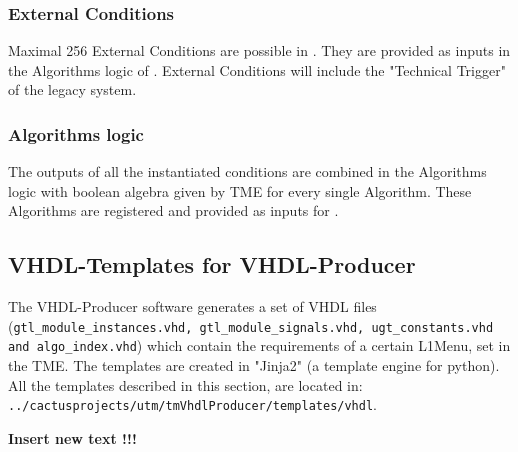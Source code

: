 \subsubsection{External Conditions}
\label{sec:gtl:external_conditions}
Maximal 256 External Conditions are possible in \gt. They are provided as inputs in the Algorithms logic of \ugtl.
External Conditions will include the "Technical Trigger" of the legacy system.

\subsubsection{Algorithms logic}
\label{sec:gtl:algorithms_logic}

The outputs of all the instantiated conditions are combined in the Algorithms logic with boolean algebra given by TME for every single Algorithm. These Algorithms are registered and provided
as inputs for \fdl.

\clearpage

\subsection{VHDL-Templates for VHDL-Producer}
\label{sec:gtl:templates_tme}

The VHDL-Producer software generates a set of VHDL files (\texttt{gtl\_module\_instances.vhd, gtl\_module\_signals.vhd, ugt\_constants.vhd and algo\_index.vhd}) which contain the requirements
of a certain L1Menu, set in the TME. The templates are created in "Jinja2" (a template engine for python).
All the templates described in this section, are located in:\\\texttt{../cactusprojects/utm/tmVhdlProducer/templates/vhdl}.

\textbf{Insert new text !!!}

